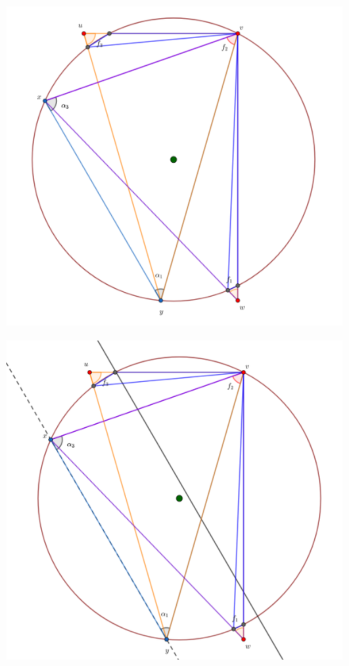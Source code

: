 {\begin{frame}
  \begin{figure}
    \centering
    \includegraphics[width=.65 \paperwidth]{./images/Bosquejo13.png}
  \end{figure}
\end{frame} 

\begin{frame}
  \begin{figure}
    \centering
    \includegraphics[width=.65 \paperwidth]{./images/Bosquejo14.png}
  \end{figure}
\end{frame}

}
